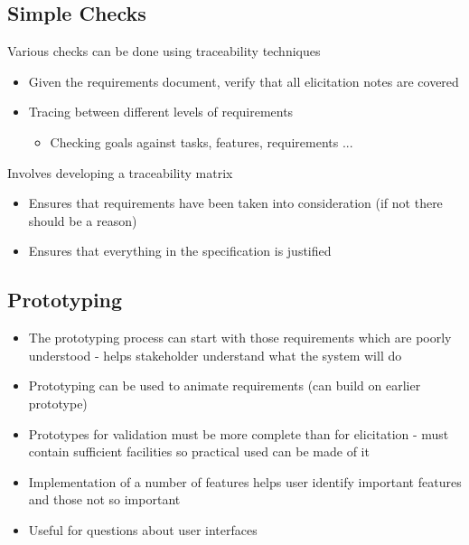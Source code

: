 \documentclass{article}[18pt]
\begin{document}
\subsection{Simple Checks}
Various checks can be done using traceability techniques
\begin{itemize}
	\item Given the requirements document, verify that all elicitation notes are covered
	\item Tracing between different levels of requirements
	\begin{itemize}
		\item Checking goals against tasks, features, requirements ...
	\end{itemize}
\end{itemize}
Involves developing a traceability matrix
\begin{itemize}
	\item Ensures that requirements have been taken into consideration (if not there should be a reason)
	\item Ensures that everything in the specification is justified
\end{itemize}
\subsection{Prototyping}
\begin{itemize}
	\item The prototyping process can start with those requirements which are poorly understood - helps stakeholder understand what the system will do
	\item Prototyping can be used to animate requirements (can build on earlier prototype)
	\item Prototypes for validation must be more complete than for elicitation - must contain sufficient facilities so practical used can be made of it
	\item Implementation of a number of features helps user identify important features and those not so important
	\item Useful for questions about user interfaces
\end{itemize}
\end{document}
